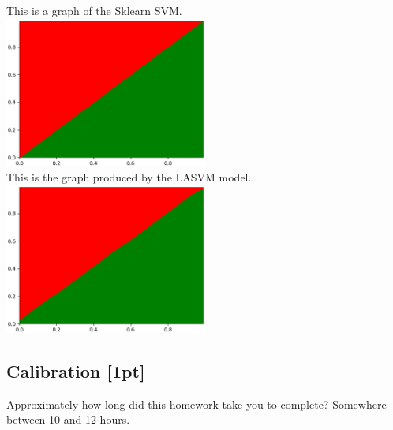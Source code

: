 \documentclass[submit]{harvardml}
\begin{document}
\begin{enumerate}
	This is a graph of the Sklearn SVM.  \\
	\includegraphics[width=0.5\textwidth]{sklearn_SVC.eps}\\
	This is the graph produced by the LASVM model. \\
	\includegraphics[width=0.5\textwidth]{lasvm.eps}\\
\end{enumerate}


\newpage

\subsection*{Calibration [1pt]}
Approximately how long did this homework take you to complete?
Somewhere between 10 and 12 hours. 
\end{document}
